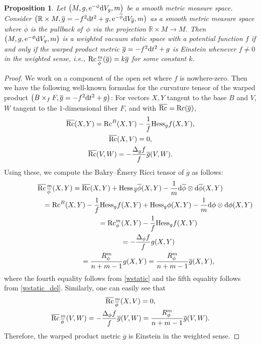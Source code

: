 \documentclass[pdftex]{sigma}
\numberwithin{equation}{section}
\newtheorem{Proposition}[Theorem]{Proposition}
 { \theoremstyle{definition}
\newtheorem{Definition}[Theorem]{Definition}
\newtheorem{Note}[Theorem]{Note}
\newtheorem{Example}[Theorem]{Example}
\newtheorem{Remark}[Theorem]{Remark} }
\begin{document}
\begin{Proposition}
 Let $\bigl(M,g,{\rm e}^{-\phi}{\rm d}V_g,m\bigr)$ be a smooth metric measure space.
 Consider $\bigl(\mathbb{R}\times M,\allowbreak \overline{g}=-f^2{\rm d}t^2+g,{\rm e}^{-\overline{\phi}}{\rm d}V_{\overline{g}},m\bigr)$ as a smooth metric measure space where $\overline{\phi}$ is the pullback of~$\phi$ via the projection $\mathbb{R}\times M\to M$. Then $\bigl(M,g,{\rm e}^{-\phi}{\rm d}V_g,m\bigr)$ is a weighted vacuum static space with a potential function $f$ if and only if the warped product metric $\overline{g}=-f^2{\rm d}t^2+g$ is Einstein whenever $f\neq0$ in the weighted sense, i.e., ${\rm Rc}\,_{\overline{\phi}}^m(\overline{g})=k\overline{g}$ for some constant $k$.
\end{Proposition}
\begin{proof}
 We work on a component of the open set where $f$ is nowhere-zero. Then
 we have the following well-known formulas for the curvature tensor of the warped product $\bigl(B\times_f F,\overline{g}=-f^2{\rm d}t^2+g\bigr)$:
 For vectors $X,Y$ tangent to the base $B$ and $V$, $W$ tangent to the $1$-dimensional fiber $F$, and with ${\rm \overline{Rc}}={\rm Rc}(\overline{g})$,
 \begin{gather*}
 {\rm \overline{Rc}}(X,Y)={\rm Rc}^B(X,Y)-\frac{1}{f}{\rm Hess}_gf(X,Y),\\
 {\rm \overline{Rc}}(X,V)=0,\\
 {\rm \overline{Rc}}(V,W)=-\frac{\Delta_gf}{f}\overline{g}(V,W).
 \end{gather*}
 Using these, we compute the Bakry--\'{E}mery Ricci tensor of $\overline{g}$ as follows:
 \begin{gather*}
 {\rm \overline{Rc}}\,_{\overline{\phi}}^m(X,Y)={\rm \overline{Rc}}(X,Y)+{\rm Hess}\,_{\overline{g}}\overline{\phi}(X,Y)-\frac{1}{m}{\rm d}\overline{\phi}\otimes {\rm d}\overline{\phi}(X,Y)\\
 \hphantom{{\rm \overline{Rc}}\,_{\overline{\phi}}^m(X,Y)}={\rm Rc}^B(X,Y)-\frac{1}{f}{\rm Hess}_gf(X,Y)+{\rm Hess}_{g}\phi(X,Y)-\frac{1}{m}{\rm d}\phi\otimes {\rm d}\phi(X,Y)\\
 \hphantom{{\rm \overline{Rc}}\,_{\overline{\phi}}^m(X,Y)}={\rm Rc}_\phi^m(X,Y)-\frac{1}{f}{\rm Hess}_gf(X,Y)\\
 \hphantom{{\rm \overline{Rc}}\,_{\overline{\phi}}^m(X,Y)}=-\frac{\Delta_\phi f}{f}g(X,Y)\\
 \hphantom{ {\rm \overline{Rc}}\,_{\overline{\phi}}^m(X,Y)}=\frac{R_\phi^m}{n+m-1}g(X,Y)=\frac{R_\phi^m}{n+m-1}\overline{g}(X,Y),
 \end{gather*}
 where the fourth equality follows from \eqref{wstatic} and the fifth equality follows from \eqref{wstatic_del}.
Similarly, one can easily see that
\begin{gather*}
 {\rm \overline{Rc}}\,_{\overline{\phi}}^m(X,V)=0,\\
 {\rm \overline{Rc}}\,_{\overline{\phi}}^m(V,W)=-\frac{\Delta_\phi f}{f}\overline{g}(V,W)=\frac{R_\phi^m}{n+m-1}\overline{g}(V,W).
\end{gather*}
Therefore, the warped product metric $\overline{g}$ is Einstein in the weighted sense.


\end{proof}
\end{document}
